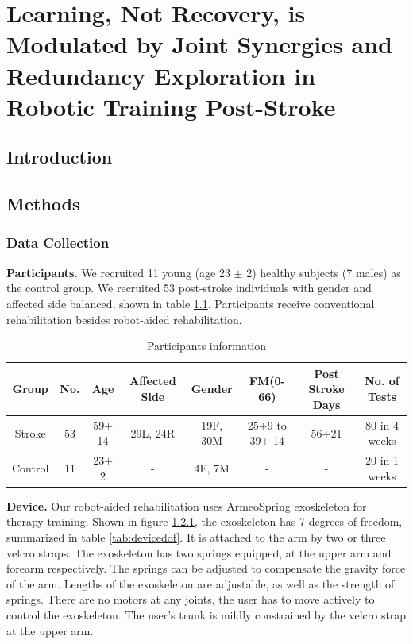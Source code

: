 \chapter{Learning, Not Recovery, is Modulated by Joint Synergies and Redundancy Exploration in Robotic Training Post-Stroke}
\label{cha:armeospring}



\section{Introduction}



\section{Methods}

\subsection{Data Collection}

\textbf{Participants.} 
We recruited 11 young (age 23 $\pm$ 2) healthy subjects (7 males) as the control group.
We recruited 53 post-stroke individuals with gender and affected side balanced, shown in table \ref{tab:demog}. 
Participants receive conventional rehabilitation besides robot-aided rehabilitation.

\begin{table}[b]
	\begin{tabular}{c c c c c c c c}
		\hline
		Group & No. & Age & Affected Side & Gender & FM(0-66) & Post Stroke Days & No. of Tests\\
		\hline
		Stroke & 53 & 59$\pm$14 & 29L, 24R & 19F, 30M & 25$\pm$9 to 39$\pm$ 14 & 56$\pm$21 & 80 in 4 weeks \\ 
		Control & 11 & 23$\pm$2 & - & 4F, 7M & - & - & 20 in 1 weeks \\
		\hline
	\end{tabular}
	\caption{Participants information}
	\label{tab:demog}
\end{table}

\textbf{Device.}
Our robot-aided rehabilitation uses ArmeoSpring exoskeleton \cite{} for therapy training. 
Shown in figure \ref{}, the exoskeleton has 7 degrees of freedom, summarized in table \ref{tab:devicedof}. 
It is attached to the arm by two or three velcro straps. 
The exoskeleton has two springs equipped, at the upper arm and forearm respectively. 
The springs can be adjusted to compensate the gravity force of the arm. 
Lengths of the exoskeleton are adjustable, as well as the strength of springs. 
There are no motors at any joints, the user has to move actively to control the exoskeleton. 
The user's trunk is mildly constrained by the velcro strap at the upper arm.  


